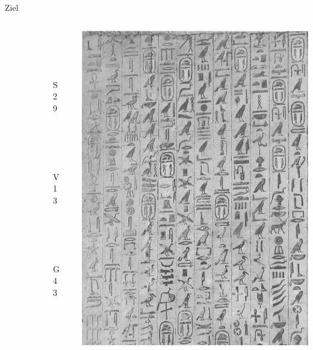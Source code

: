 \documentclass[hyperref={pdfpagelabels=false}]{beamer}
\begin{document}
\begin{frame}{Ziel}
	\begin{columns}
		\begin{column}{0.5\textwidth}
			\begin{figure}[h]
				\begin{subfigure}{0.3\textwidth}
					\includegraphics[width=0.9\linewidth, height=2cm]{img/200000_S29.png}
					\caption{S29}
					\label{fig:s29}
				\end{subfigure}
				\begin{subfigure}{0.3\textwidth}
					\includegraphics[width=0.9\linewidth, height=2cm]{img/200001_V13.png}
					\caption{V13}
					\label{fig:v13}
				\end{subfigure}
				\begin{subfigure}{0.3\textwidth}
					\includegraphics[width=0.9\linewidth, height=2cm]{img/200003_G43.png}
					\caption{G43}
					\label{fig:g43}
				\end{subfigure}
				\caption{}
				\label{fig:img}
			\end{figure}
		\end{column}
		\begin{column}{0.5\textwidth}
			\includegraphics[width=0.7\linewidth]{img/egyptianTexts3.jpg}
		\end{column}
	\end{columns}
\end{frame}
\end{document}
